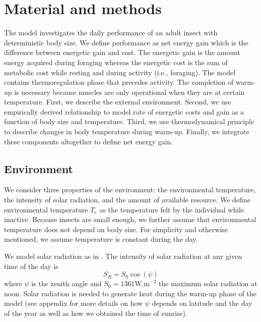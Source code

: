 \section*{Material and methods}
The model investigates the daily performance of an adult insect with deterministic body size.
We define performance as net energy gain which is the difference between energetic gain and cost.
The energetic gain is the amount energy acquired during foraging whereas  the energetic cost is the sum of metabolic cost while resting and during activity (i.e., foraging).
The model contains thermoregulation phase that precedes activity.
The completion of warm-up is necessary because muscles are only operational when they are at certain temperature. 
First, we describe the external environment.
Second, we use empirically derived relationship to model rate of energetic costs and gain as a function of body size and temperature.
Third, we use thermodynamical principle to describe changes in body temperature during warm-up.
Finally, we integrate these components altogether to define net energy gain. 

\subsection*{Environment}
We consider three properties of the environment: the environmental temperature, the intensity of solar radiation, and the amount of available resource.
We define environmental temperature $T_e$ as the temperature felt by the individual while inactive.
Because insects are small enough, we further assume that environmental temperature does not depend on body size.
For simplicity and otherwise mentioned, we assume temperature is constant during the day. %

We model solar radiation as in \citet{Campbell2012}.
The intensity of solar radiation at any given time of the day is \[S_R = S_0 \cos(\psi) \]
where $\psi$ is the zenith angle and $S_0 = 1361 \mbox{W.m}^{-2}$ the maximum solar radiation at noon.
Solar radiation is needed to generate heat during the warm-up phase of the model (see appendix for more details on how $\psi$ depends on latitude and the day of the year as well as how we obtained the time of sunrise).

